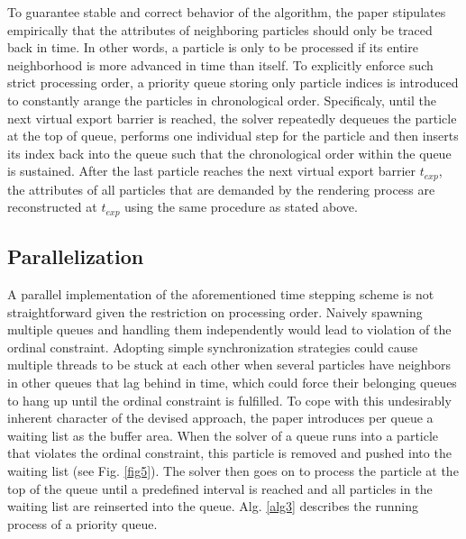 \documentclass[
	11pt, 
	DIV10,
	ngerman,
	a4paper, 
	oneside, 
	headings=normal, 
	captions=tableheading,
	final, 
	numbers=noenddot
]{scrartcl}
\begin{document}
To guarantee stable and correct behavior of the algorithm, the paper stipulates empirically that the attributes of neighboring particles should only be traced back in time. In other words, a particle is only to be processed if its entire neighborhood is more advanced in time than itself. To explicitly enforce such strict processing order, a priority queue storing only particle indices is introduced to constantly arange the particles in chronological order. Specificaly, until the next virtual export barrier is reached, the solver repeatedly dequeues the particle at the top of queue, performs one individual step for the particle and then inserts its index back into the queue such that the chronological order within the queue is sustained. After the last particle reaches the next virtual export barrier $t_{exp}$, the attributes of all particles that are demanded by the rendering process are reconstructed at $t_{exp}$ using the same procedure as stated above.

\subsection{Parallelization}

A parallel implementation of the aforementioned time stepping scheme is not straightforward given the restriction on processing order. Naively spawning multiple queues and handling them independently would lead to violation of the ordinal constraint. Adopting simple synchronization strategies could cause multiple threads to be stuck at each other when several particles have neighbors in other queues that lag behind in time, which could force their belonging queues to hang up until the ordinal constraint is fulfilled. To cope with this undesirably inherent character of the devised approach, the paper introduces per queue a waiting list as the buffer area. When the solver of a queue runs into a particle that violates the ordinal constraint, this particle is removed and pushed into the waiting list (see Fig. \ref{fig5}). The solver then goes on to process the particle at the top of the queue until a predefined interval is reached and all particles in the waiting list are reinserted into the queue. Alg. \ref{alg3} describes the running process of a priority queue.
\end{document}
